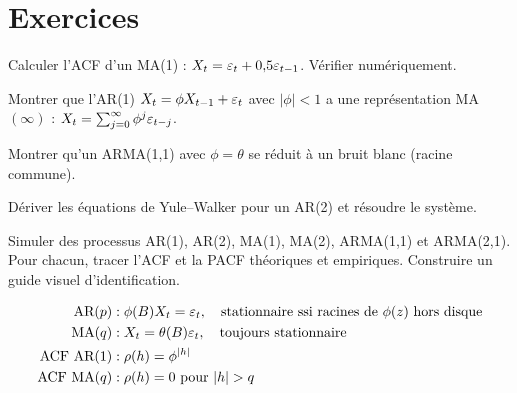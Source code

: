 \section{Exercices}

\begin{exercice}[$\star$]
Calculer l'ACF d'un MA(1) : $X_t = \varepsilon_t+0{,}5\varepsilon_{t-1}$. V\'erifier num\'eriquement.
\end{exercice}

\begin{exercice}[$\star\star$]
Montrer que l'AR(1) $X_t = \phi X_{t-1}+\varepsilon_t$ avec $|\phi|<1$ a une repr\'esentation MA$(\infty)$ : $X_t = \sum_{j=0}^{\infty}\phi^j\varepsilon_{t-j}$.
\end{exercice}

\begin{exercice}[$\star\star$]
Montrer qu'un ARMA(1,1) avec $\phi=\theta$ se r\'eduit \`a un bruit blanc (racine commune).
\end{exercice}

\begin{exercice}[$\star\star$]
D\'eriver les \'equations de Yule--Walker pour un AR(2) et r\'esoudre le syst\`eme.
\end{exercice}

\begin{exercice}
Simuler des processus AR(1), AR(2), MA(1), MA(2), ARMA(1,1) et ARMA(2,1). Pour chacun, tracer l'ACF et la PACF th\'eoriques et empiriques. Construire un guide visuel d'identification.
\end{exercice}

\begin{formules}
\begin{align*}
\text{AR}(p) &: \phi(B)X_t=\eps_t, \quad \text{stationnaire ssi racines de }\phi(z)\text{ hors disque} \\
\text{MA}(q) &: X_t=\theta(B)\eps_t, \quad \text{toujours stationnaire} \\
\text{ACF AR}(1) &: \rho(h)=\phi^{|h|} \\
\text{ACF MA}(q) &: \rho(h)=0\text{ pour }|h|>q
\end{align*}
\end{formules}

